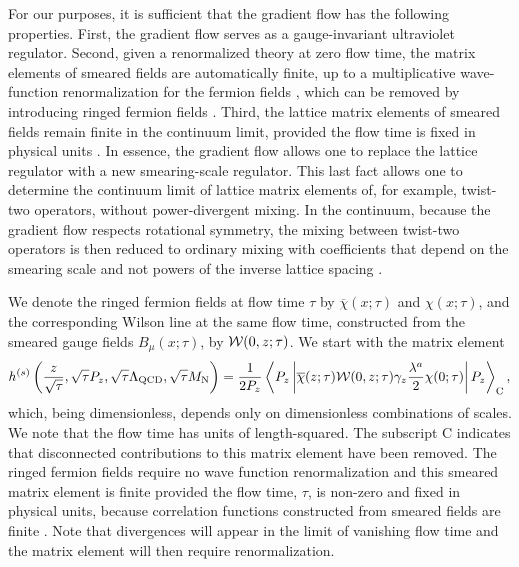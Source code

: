 For our purposes, it is sufficient that the gradient flow has the following 
properties. First, the gradient flow serves as a gauge-invariant ultraviolet 
regulator. Second, given a renormalized theory at zero flow time, the matrix 
elements of smeared fields are automatically finite, up to a multiplicative 
wave-function renormalization for the fermion fields \cite{Luscher:2013cpa}, 
which can be removed by introducing ringed fermion fields 
\cite{Makino:2014taa,Hieda:2016lly}. 
Third, the lattice matrix elements of smeared fields
remain finite in the continuum limit, provided the flow time is fixed in 
physical units \cite{Luscher:2013cpa,Monahan:2015lha}. In essence, the gradient 
flow allows 
one to replace the lattice regulator with a new smearing-scale regulator. This 
last fact allows one to determine the continuum limit of lattice matrix 
elements 
of, for example, twist-two operators, without power-divergent mixing. In the 
continuum, because the gradient flow respects rotational symmetry, the mixing 
between twist-two operators is then reduced to ordinary mixing with 
coefficients 
that depend on the smearing scale and not powers of the inverse lattice spacing 
\cite{Monahan:2015lha}.

We denote the ringed fermion fields at flow time $\tau$ by
$\overline{\chi}(x;\tau)$ and $\chi(x;\tau)$, and the corresponding Wilson line 
at the same flow time, constructed from the smeared gauge fields 
$B_\mu(x;\tau)$, by ${\bf\cal W}(0,z;\tau)$.
We start with the matrix element
\begin{equation}\label{eq:hdef}
h^{(s)}\left(\frac{z}{\sqrt{\tau}},\sqrt{\tau}P_z,
\sqrt{\tau}\Lambda_{\mathrm{QCD}},\sqrt{\tau}M_\mathrm{N}\right) = 
\frac{1}{2P_z}\left\langle 
P_z \left| \overline{\chi}(z;\tau) 
{\bf\cal W}(0,z;\tau)\gamma_z\frac{\lambda^a}{2}\chi(0;\tau)\right| 
P_z\right\rangle_\mathrm{C},
\end{equation}
which, being dimensionless, depends only on dimensionless combinations of 
scales. We note that the flow time has units of length-squared. The subscript C 
indicates that disconnected contributions to this 
matrix element have been removed. The ringed fermion fields require no wave
function renormalization and this smeared matrix element is finite 
provided the flow time, $\tau$, is non-zero and fixed in physical units, 
because correlation functions constructed from smeared fields are finite 
\cite{Luscher:2011bx,Luscher:2013cpa}. Note that divergences will appear in the 
limit of vanishing flow time and the matrix element will then require
renormalization.

